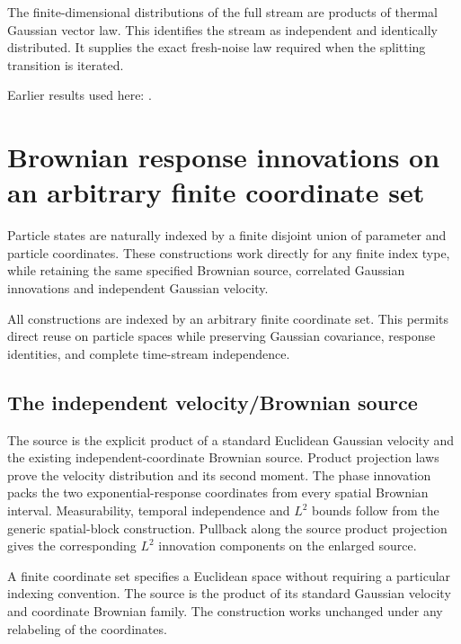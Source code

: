 \documentclass[11pt,a4paper]{report}
\begin{document}
The finite-dimensional distributions of the full stream are products of thermal Gaussian vector law. This identifies the stream as independent and identically distributed. It supplies the exact fresh-noise law required when the splitting transition is iterated.



Earlier results used here: \cite[Section~3.8.17]{LangevinLean2026ULASC}.
\section{\texorpdfstring{Brownian response innovations on an arbitrary finite coordinate set}{Brownian response innovations on an arbitrary finite coordinate set}}
\label{proof-module-KineticLangevin-GenericCanonicalSource-lean}


Particle states are naturally indexed by a finite disjoint union of parameter and particle coordinates. These constructions work directly for any finite index type, while retaining the same specified Brownian source, correlated Gaussian innovations and independent Gaussian velocity.



All constructions are indexed by an arbitrary finite coordinate set. This permits direct reuse on particle spaces while preserving Gaussian covariance, response identities, and complete time-stream independence.

\subsection{\texorpdfstring{The independent velocity/\allowbreak{}Brownian source}{The independent velocity/Brownian source}}
\label{report-step-KineticLangevin-GenericCanonicalSource-lean-1}


The source is the explicit product of a standard Euclidean Gaussian velocity and the existing independent-coordinate Brownian source. Product projection laws prove the velocity distribution and its second moment. The phase innovation packs the two exponential-response coordinates from every spatial Brownian interval. Measurability, temporal independence and \(L^{2}\) bounds follow from the generic spatial-block construction. Pullback along the source product projection gives the corresponding \(L^{2}\) innovation components on the enlarged source.



A finite coordinate set specifies a Euclidean space without requiring a particular indexing convention. The source is the product of its standard Gaussian velocity and coordinate Brownian family. The construction works unchanged under any relabeling of the coordinates.
\end{document}
